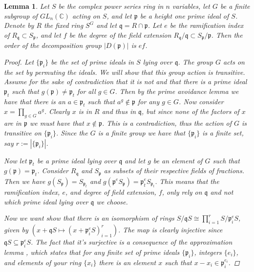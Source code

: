\documentclass[11pt, a4paper, english]{article}
\newtheorem{lemma}[theorem]{Lemma}
\theoremstyle{definition}
\newcommand{\C}{\mathbb{C}}
\begin{document}
\begin{lemma}
Let $S$ be the complex power series ring in $n$ variables, let $G$ be  a finite subgroup of $GL_n(\C)$ acting on $S$, and let $\mathfrak{p}$ be a height one prime ideal of $S$. Denote by $R$ the fixed ring $S^G$ and let $\mathfrak{q} = R \cap \mathfrak{p}$. Let $e$ be the ramification index of $R_\mathfrak{q} \subset S_\mathfrak{p}$, and let $f$ be the degree of the field extension $R_\mathfrak{q}/\mathfrak{q} \subset S_\mathfrak{p}/\mathfrak{p}$. Then the order of the decomposition group $|D(\mathfrak{p})|$ is $ef$.

\begin{proof}
Let $\{ \mathfrak{p}_i \}$ be the set of prime ideals in $S$ lying over $\mathfrak{q}$. The group $G$ acts on the set by permuting the ideals. We will show that this group action is transitive. Assume for the sake of contradiction that it is not and that there is a prime ideal $\mathfrak{p}_t$ such that $g(\mathfrak{p}) \neq \mathfrak{p}_t$ for all $g \in G$. Then by the prime avoidance lemma \cite[Lemma~3.2]{Eis95} we have that there is an $a \in \mathfrak{p}_t$ such that $a^g \not\in \mathfrak{p}$ for any $g \in G$. Now consider $x = \prod_{g \in G} a^g$. Clearly $x$ is in $R$ and thus in $\mathfrak{q}$, but since none of the factors of $x$ are in $\mathfrak{p}$ we must have that $x \not\in \mathfrak{p}$. This is a contradiction, thus the action of $G$ is transitive on $\{ \mathfrak{p}_i \}$. Since the $G$ is a finite group we have that $\{ \mathfrak{p}_i \}$ is a finite set, say $r := |\{ \mathfrak{p}_i \}|$.

Now let $\mathfrak{p}_t$ be a prime ideal lying over $\mathfrak{q}$ and let $g$ be an element of $G$ such that $g(\mathfrak{p}) = \mathfrak{p}_t$. Consider $R_\mathfrak{q}$ and $S_\mathfrak{p}$ as subsets of their respective fields of fractions. Then we have $g(S_\mathfrak{p}) = S_{\mathfrak{p}_t}$ and $g(\mathfrak{p}^e S_\mathfrak{p}) = \mathfrak{p}_t^e S_{\mathfrak{p}_t}$. This means that the ramification index, $e$, and degree of field extension, $f$, only rely on $\mathfrak{q}$ and not which prime ideal lying over $\mathfrak{q}$ we choose. 

Now we want show that there is an isomorphism of rings $S/\mathfrak{q}S \cong \prod_{i=1}^r S/\mathfrak{p}_i^e S$, given by $\left( x + \mathfrak{q}S \mapsto (x + \mathfrak{p}_i^e S)_{i=1}^r \right)$. The map is clearly injective since $\mathfrak{q}S \subseteq \mathfrak{p}_i^e S$. The fact that it's surjective is a consequence of the approximation lemma \cite[p.12]{Serre}, which states that for any finite set of prime ideals $\{ \mathfrak{p}_i \}$, integers $\{e_i\}$, and elements of your ring $\{x_i\}$ there is an element $x$ such that $x-x_i \in \mathfrak{p}_i^{e_i}$.


\end{proof}
\end{lemma}
\end{document}
